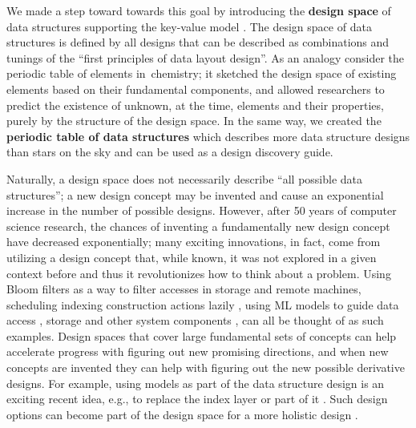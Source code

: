 \documentclass[11pt]{article}
\begin{document}
We made a step toward towards this goal by introducing the \textbf{design space} of data structures supporting the key-value model \cite{Idreos2018}. The design space of data structures is defined by all designs that can be described as combinations and tunings of the ``first principles of data layout design''. As an analogy consider the periodic table of elements in~chemistry; it sketched the design space of existing elements based on their fundamental components, and allowed researchers to predict the existence of unknown, at the time, elements and their properties, purely by the structure of the design space. In the same way, we created the \textbf{periodic table of data structures} \cite{Idreos2018a} which describes more data structure designs than stars on the sky and can be used as a design discovery guide. 

Naturally, a design space does not necessarily describe ``all possible data structures''; a new design concept may be invented and cause an exponential increase in the number of possible designs. However, after 50 years of computer science research, the chances of inventing a fundamentally new design concept have decreased exponentially; many exciting innovations, in fact, come from utilizing a design concept that, while known, it was not explored in a given context before and thus it revolutionizes how to think about a problem. Using Bloom filters as a way to filter accesses in storage and remote machines, scheduling indexing construction actions lazily \cite{Idreos2007}, using ML models to guide data access \cite{Kraska2018}, storage \cite{Kersten2017} and other system components \cite{Kraska2019}, can all be thought of as such examples.
Design spaces that cover large fundamental sets of concepts can help accelerate progress with figuring out new promising directions, and when new concepts are invented they can help with figuring out the new possible derivative designs. For example, using models as part of the data structure design is an exciting recent idea, e.g., to replace the index layer or part of it \cite{Kraska2018,Kraska2019}. Such design options can become part of the design space for a more holistic design \cite{Idreos2019a}.
\end{document}
